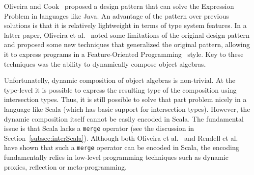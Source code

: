 



Oliveira and Cook~\cite{oliveira2012extensibility} proposed a design pattern that can solve the
Expression Problem in languages like Java. An advantage of the pattern
over previous solutions is that it is relatively lightweight in terms
of type system features. In a latter paper, Oliveira et al.~\cite{oliveira2013feature}
noted some limitations of the original design pattern and proposed 
some new techniques that generalized the original pattern, allowing it 
to express programs in a Feature-Oriented Programming~\cite{Prehofer97} style.
Key to these techniques was the ability to dynamically compose object
algebras.

Unfortunatelly, dynamic composition of object algebras is
non-trivial. At the type-level it is possible to express the resulting
type of the composition using intersection types. Thus, it is still
possible to solve that part problem nicely in a language like Scala (which
has basic support for intersection types). However, the dynamic
composition itself cannot be easily encoded in Scala. The fundamental 
issue is that Scala lacks a \lstinline{merge} operator (see the
discussion in Section~\ref{subsec:interScala}). Although both Oliveira et al.~\cite{oliveira2013feature} and
Rendell et al.~\cite{rendel14attributes} have shown that such a \lstinline{merge} operator can
be encoded in Scala, the encoding fundamentally relies in low-level
programming techniques such as dynamic proxies, reflection or
meta-programming. 

